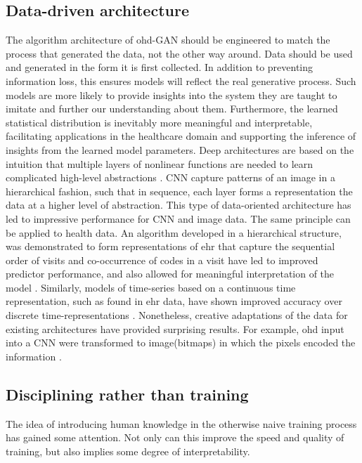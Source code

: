 \subsection{Data-driven architecture}\label{sec:archi}
The algorithm architecture of \gls{ohd}-GAN should be engineered to match the process that generated the data, not the other way around. Data should be used and generated in the form it is first collected. In addition to preventing information loss, this ensures models will reflect the real generative process. Such models are more likely to provide insights into the system they are taught to imitate and further our understanding about them. Furthermore, the learned statistical distribution is inevitably more meaningful and interpretable, facilitating applications in the healthcare domain and supporting the inference of insights from the learned model parameters.
Deep architectures are based on the intuition that multiple layers of nonlinear functions are needed to learn complicated high-level abstractions \cite{Bengio_2009}. CNN capture patterns of an image in a hierarchical fashion, such that in sequence, each layer forms a representation the data at a higher level of abstraction. This type of data-oriented architecture has led to impressive performance for CNN and image data. The same principle can be applied to health data. An algorithm developed in a hierarchical structure, was demonstrated to form representations of \gls{ehr} that capture the sequential order of visits and co-occurrence of codes in a visit have led to improved predictor performance, and also allowed for meaningful interpretation of the model \cite{choi2016multi}. Similarly, models of time-series based on a continuous time representation, such as found in \gls{ehr} data, have shown improved accuracy over discrete time-representations \cite{rubanova2019latent,de2019gru}. Nonetheless, creative adaptations of the data for existing architectures have provided surprising results. For example, \gls{ohd} input into a CNN were transformed to image(bitmaps) in which the pixels encoded the information \cite{Fukae2020}.

\subsection{Disciplining rather than training}
The idea of introducing human knowledge in the otherwise naive training process has gained some attention. Not only can this improve the speed and quality of training, but also implies some degree of interpretability.

